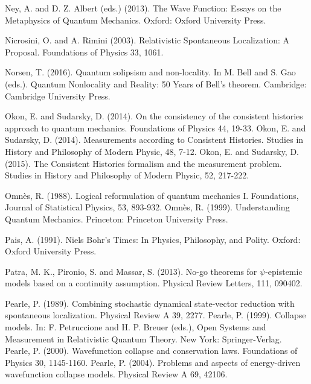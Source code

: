 \begin{thebibliography}{}
\bibitem{} Ney, A. and D. Z. Albert (eds.) (2013). The Wave Function: Essays on the Metaphysics of Quantum Mechanics. Oxford: Oxford University Press.

\bibitem{} Nicrosini, O. and A. Rimini (2003). Relativistic Spontaneous Localization: A Proposal. Foundations of Physics 33, 1061.

\bibitem{} Norsen, T. (2016). Quantum solipsism and non-locality. In M. Bell and S. Gao (eds.). Quantum Nonlocality and Reality: 50 Years of Bell’s theorem. Cambridge: Cambridge University Press.


\bibitem{} Okon, E. and Sudarsky, D. (2014). On the consistency of the consistent histories approach to quantum mechanics. Foundations of Physics 44, 19-33.
\bibitem{} Okon, E. and Sudarsky, D. (2014). Measurements according to Consistent Histories. Studies in History and Philosophy of Modern Physic, 48, 7-12.
\bibitem{} Okon, E. and Sudarsky, D. (2015). The Consistent Histories formalism and the measurement problem. Studies in History and Philosophy of Modern Physic, 52, 217-222.

\bibitem{} Omn\`{e}s, R. (1988). Logical reformulation of quantum mechanics I. Foundations, Journal of Statistical Physics, 53, 893-932.
\bibitem{} Omn\`{e}s, R. (1999). Understanding Quantum Mechanics. Princeton: Princeton University Press.


\bibitem{} Pais, A. (1991). Niels Bohr’s Times: In Physics, Philosophy, and Polity. Oxford: Oxford University Press.

\bibitem{} Patra, M. K., Pironio,  S. and Massar, S. (2013). No-go theorems for $\psi$-epistemic models based on a continuity assumption. Physical Review Letters, 111, 090402.


\bibitem{} Pearle, P. (1989). Combining stochastic dynamical state-vector reduction with spontaneous localization. Physical Review A 39, 2277. 
\bibitem{} Pearle, P. (1999). Collapse models. In: F. Petruccione and  H. P. Breuer (eds.), Open Systems and Measurement in Relativistic Quantum Theory. New York: Springer-Verlag.
\bibitem{} Pearle, P. (2000). Wavefunction collapse and conservation laws. Foundations of Physics 30, 1145-1160.
\bibitem{} Pearle, P. (2004). Problems and aspects of energy-driven wavefunction collapse models. Physical Review A 69, 42106. 


\end{thebibliography}
